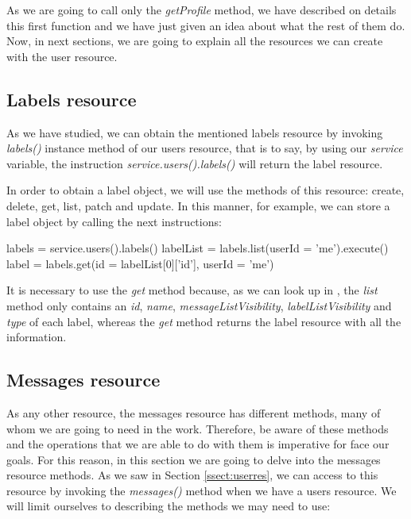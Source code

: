 As we are going to call only the \textit{getProfile} method, we have described on details this first function and we have just given an idea about what the rest of them do. Now, in next sections, we are going to explain all the resources we can create with the user resource.

\subsection{Labels resource}\label{ssect:labres}
As we have studied, we can obtain the mentioned labels resource \citep[/v1/reference/users/labels]{gmailAPI} by invoking \textit{labels()} instance method of our users resource, that is to say, by using our \textit{service} variable, the instruction \textit{service.users().labels()} will return the label resource.


In order to obtain a label object, we will use the methods of this resource: create, delete, get, list, patch and update. In this manner, for example, we can store a label object by calling the next instructions:

\begin{python}
	labels = service.users().labels()
	labelList = labels.list(userId = 'me').execute()
	label = labels.get(id = labelList[0]['id'], userId = 'me')
\end{python}

It is necessary to use the \textit{get} method because, as we can look up in \cite[/v1/reference/users/labels/list]{gmailAPI}, the \textit{list} method only contains an \textit{id}, \textit{name}, \textit{messageListVisibility}, \textit{labelListVisibility} and \textit{type} of each label, whereas the \textit{get} method returns the label resource with all the information.

\subsection{Messages resource}\label{ssect:msgres}
As any other resource, the messages resource has different methods, many of whom we are going to need in the work. Therefore, be aware of these methods and the operations that we are able to do with them is imperative for face our goals. For this reason, in this section we are going to delve into the messages resource methods. As we saw in Section \ref{ssect:userres}, we can access to this resource by invoking the \textit{messages()} method when we have a users resource. We will limit ourselves to describing the methods we may need to use:

